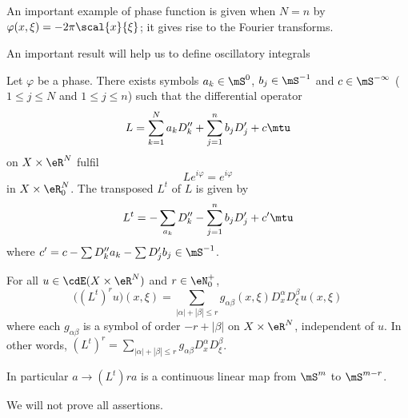 An important example of phase function is given when $N=n$ by $\varphi (x,\xi)=-2\pi \scal{x}{\xi}$; it gives rise to the Fourier transforms.

An important result will help us to define oscillatory integrals

\begin{lemma}  \label{lem:defL}
Let $\varphi$ be a phase. There exists symbols $a_k\in \mS^0$, $b_j\in\mS^{-1}$ and $c\in\mS^{-\infty}$ ($1\leq j\leq N$ and $1\leq j\leq n$) such that the differential operator
\[ 
  L=\sum_{k=1}^Na_kD''_k+\sum_{j=1}^nb_jD'_j+c\mtu
\]
on $X\times\eR^N$ fulfil
\[ 
  Le^{i\varphi}=e^{i\varphi}
\]
in $X\times\eR^N_0$. The transposed $L^t$ of $L$ is given by
\[ 
  L^t=-\sum_{a_k}D''_k-\sum_{j=1}^nb_jD'_j+c'\mtu
\]
where $c'=c-\sum D''_ka_k-\sum D'_jb_j\in\mS^{-1}$.

For all $u\in\cdE(X\times\eR^N)$ and $r\in\eN^+_0$,
\[ 
  \big( (L^t)^ru \big)(x,\xi)=\sum_{| \alpha |+| \beta |\leq r}g_{\alpha\beta}(x,\xi)D_x^{\alpha}D_{\xi}^{\beta} u (x,\xi)
\]
where each $g_{\alpha\beta}$ is a symbol of order $-r+| \beta |$ on $X\times\eR^N$, independent of $u$. In other words, 
$(L^t)^r= \sum_{| \alpha |+| \beta |\leq r}g_{\alpha\beta}D_x^{\alpha}D_{\xi}^{\beta}$.

In particular $a\to (L^t)ra$ is a continuous linear map from $\mS^m$ to $\mS^{m-r}$.

\end{lemma}

We will not prove all assertions.

